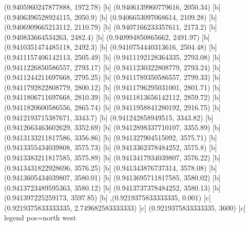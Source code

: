{{{(0.9405960247877888, 1972.78) [b] 
(0.9406139960779616, 2050.34) [b] 
(0.9406396528924115, 2050.9) [b] 
(0.9406653097068614, 2109.28) [b] 
(0.9406909665213112, 2110.79) [b] 
(0.9407166233357611, 2173.2) [b] 
(0.940833664534263, 2482.4) [b] 
(0.940994850865662, 2491.97) [b] 
(0.9410351474485118, 2492.3) [b] 
(0.9410754440313616, 2504.48) [b] 
(0.9411157406142113, 2505.49) [b] 
(0.9411192128364335, 2793.08) [b] 
(0.9411226850586557, 2793.17) [b] 
(0.9411230322808779, 2793.24) [b] 
(0.9411244211697668, 2795.25) [b] 
(0.9411789350586557, 2799.33) [b] 
(0.9411792822808779, 2800.12) [b] 
(0.9411796295031001, 2801.71) [b] 
(0.9411806711697668, 2810.39) [b] 
(0.9411813656142112, 2859.72) [b] 
(0.9411820600586556, 2865.74) [b] 
(0.9411958841280192, 2916.75) [b] 
(0.9412193715387671, 3343.7) [b] 
(0.941242858949515, 3343.82) [b] 
(0.9412663463602629, 3352.69) [b] 
(0.9412898337710107, 3355.89) [b] 
(0.9413133211817586, 3356.86) [b] 
(0.941327904515092, 3575.71) [b] 
(0.9413355434039808, 3575.73) [b] 
(0.9413362378484252, 3575.8) [b] 
(0.9413383211817585, 3575.89) [b] 
(0.9413417934039807, 3576.22) [b] 
(0.9413431822928696, 3576.25) [b] 
(0.941343876737314, 3578.08) [b] 
(0.9413605434039807, 3580.01) [b] 
(0.9413695711817585, 3580.02) [b] 
(0.9413723489595363, 3580.12) [b] 
(0.9413737378484252, 3580.13) [b] 
(0.941397225259173, 3597.85) [b] 
},{(0.9219375833333335, 0.001) [c] 
(0.9219375833333335, 2.749682583333333) [c] 
(0.9219375833333335, 3600) [c] 
}}}{legend pos=north west}